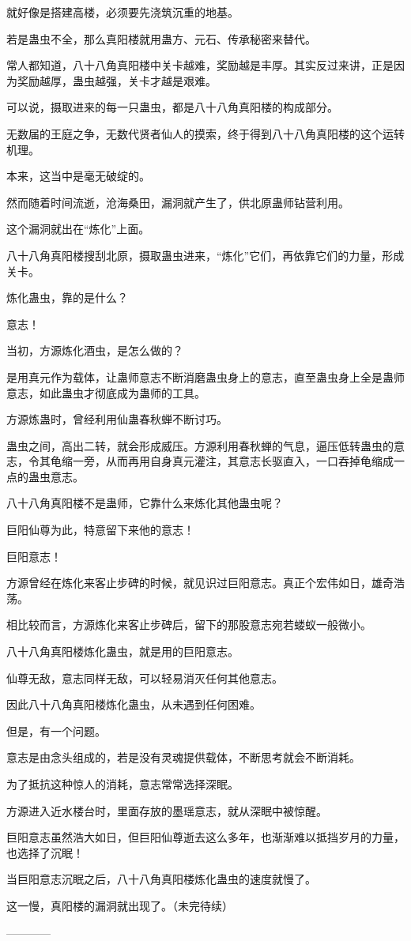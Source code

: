\begin{this_body}
就好像是搭建高楼，必须要先浇筑沉重的地基。

若是蛊虫不全，那么真阳楼就用蛊方、元石、传承秘密来替代。

常人都知道，八十八角真阳楼中关卡越难，奖励越是丰厚。其实反过来讲，正是因为奖励越厚，蛊虫越强，关卡才越是艰难。

可以说，摄取进来的每一只蛊虫，都是八十八角真阳楼的构成部分。

无数届的王庭之争，无数代贤者仙人的摸索，终于得到八十八角真阳楼的这个运转机理。

本来，这当中是毫无破绽的。

然而随着时间流逝，沧海桑田，漏洞就产生了，供北原蛊师钻营利用。

这个漏洞就出在“炼化”上面。

八十八角真阳楼搜刮北原，摄取蛊虫进来，“炼化”它们，再依靠它们的力量，形成关卡。

炼化蛊虫，靠的是什么？

意志！

当初，方源炼化酒虫，是怎么做的？

是用真元作为载体，让蛊师意志不断消磨蛊虫身上的意志，直至蛊虫身上全是蛊师意志，如此蛊虫才彻底成为蛊师的工具。

方源炼蛊时，曾经利用仙蛊春秋蝉不断讨巧。

蛊虫之间，高出二转，就会形成威压。方源利用春秋蝉的气息，逼压低转蛊虫的意志，令其龟缩一旁，从而再用自身真元灌注，其意志长驱直入，一口吞掉龟缩成一点的蛊虫意志。

八十八角真阳楼不是蛊师，它靠什么来炼化其他蛊虫呢？

巨阳仙尊为此，特意留下来他的意志！

巨阳意志！

方源曾经在炼化来客止步碑的时候，就见识过巨阳意志。真正个宏伟如日，雄奇浩荡。

相比较而言，方源炼化来客止步碑后，留下的那股意志宛若蝼蚁一般微小。

八十八角真阳楼炼化蛊虫，就是用的巨阳意志。

仙尊无敌，意志同样无敌，可以轻易消灭任何其他意志。

因此八十八角真阳楼炼化蛊虫，从未遇到任何困难。

但是，有一个问题。

意志是由念头组成的，若是没有灵魂提供载体，不断思考就会不断消耗。

为了抵抗这种惊人的消耗，意志常常选择深眠。

方源进入近水楼台时，里面存放的墨瑶意志，就从深眠中被惊醒。

巨阳意志虽然浩大如日，但巨阳仙尊逝去这么多年，也渐渐难以抵挡岁月的力量，也选择了沉眠！

当巨阳意志沉眠之后，八十八角真阳楼炼化蛊虫的速度就慢了。

这一慢，真阳楼的漏洞就出现了。（未完待续）

------------

\end{this_body}

